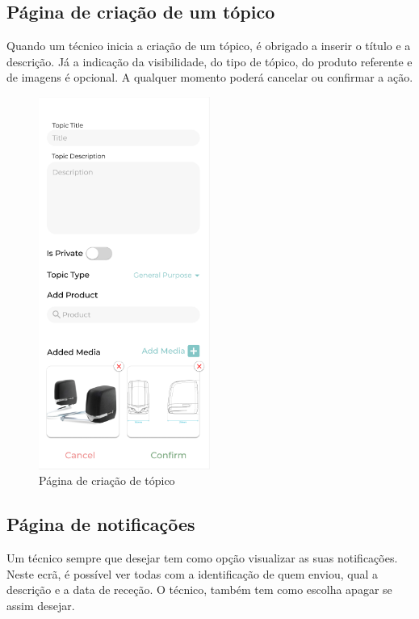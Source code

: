 \newpage

\subsection{Página de criação de um tópico}

Quando um técnico inicia a criação de um tópico, é obrigado a inserir o título e a descrição. Já a indicação da visibilidade, do tipo de tópico, do produto referente e de imagens é opcional. A qualquer momento poderá cancelar ou confirmar a ação.

\begin{figure}[htb]
    \centering
    \includegraphics[width=0.5\textwidth]{images/mockups/forum_create_topic.png}
    \caption{Página de criação de tópico}
    \label{fig:28}
\end{figure}

\newpage

\subsection{Página de notificações}

Um técnico sempre que desejar tem como opção visualizar as suas notificações. Neste ecrã, é possível ver todas com a identificação de quem enviou, qual a descrição e a data de receção. O técnico, também tem como escolha apagar se assim desejar.

